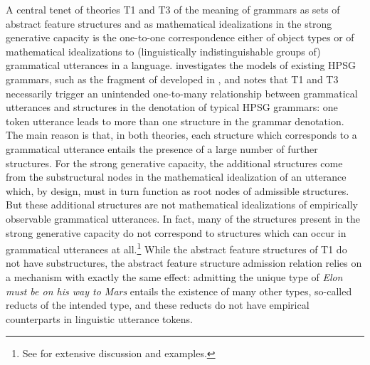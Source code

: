\documentclass[output=paper
 	        ,biblatex
                ,babelshorthands
                ,newtxmath
                ,draftmode
                ,colorlinks, citecolor=brown
]{langscibook}
\begin{document}
{A central tenet of theories T1 and T3 of the meaning of grammars as
sets of abstract feature structures and as mathematical idealizations
in the strong generative capacity is the one-to-one
correspondence either of object types or of mathematical idealizations
to (linguistically indistinguishable groups of) grammatical utterances
in a language. \citet{Richter2007a}
investigates the models of existing HPSG grammars, such as the fragment
of  developed in \cite{PollardSag1994}, and notes that
T1 and T3 necessarily trigger an unintended one-to-many
relationship between grammatical utterances and structures in the
denotation of typical HPSG grammars: one token utterance leads to more than one
structure in the grammar denotation. The main reason
is that, in both theories, each structure which corresponds
to a grammatical utterance entails the presence of a large
number of further structures. For the strong generative capacity,
the additional structures come from the substructural nodes in the
mathematical idealization of an utterance which, by design, must
in turn function as root nodes of admissible structures. But these additional
structures are not mathematical idealizations of empirically
observable grammatical utterances. In fact, many of the structures
present in the strong generative capacity do not correspond to
structures which can occur in grammatical utterances at all.\footnote{See
  \cite[Section 4]{Richter2007a} for extensive discussion and 
  examples.} While the abstract feature structures
of T1 do not have substructures, the abstract feature structure admission
relation relies on a mechanism with exactly the same effect: admitting
the unique type of \emph{Elon must be on his way to Mars} entails the existence
of many other types, so-called reducts of the intended
type, and these reducts do not have empirical counterparts in linguistic
utterance tokens.



}
\end{document}
